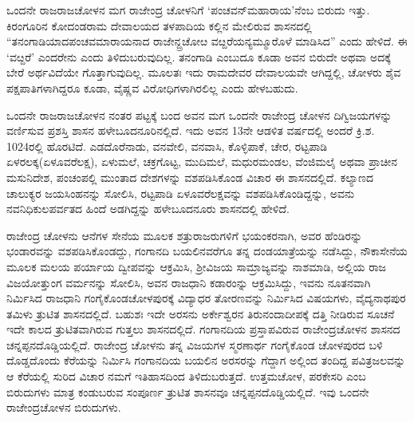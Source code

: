 ಒಂದನೇ ರಾಜರಾಜಚೋಳನ ಮಗ ರಾಜೇಂದ್ರ ಚೋಳನಿಗೆ ‘ಪಂಚವನ್​ಮಹಾರಾಯ’ನೆಂಬ ಬಿರುದು ಇತ್ತು. ಕಿರಂಗೂರಿನ ಕೋದಂಡರಾಮ ದೇವಾಲಯದ ತಳಪಾದಿಯ ಕಲ್ಲಿನ ಮೇಲಿರುವ ಶಾಸನದಲ್ಲಿ “ತನಂಗಾಡಿಯಾದ\break ಪಂಚವಮಾರಾಯನಾದ ರಾಜೇನ್ದ್ರಚೋೞ ವೞ್ದರೆಯನ್ಯಮ್ಮೂರೊಳೆ ಮಾಡಿಸಿದ” ಎಂದು ಹೇಳಿದೆ. ಈ ‘ವೞ್ದರೆ’ ಎಂದರೇನು ಎಂದು ತಿಳಿದುಬರುವುದಿಲ್ಲ. ತನಂಗಾಡಿ ಎಂಬುದೂ ಕೂಡಾ ಅವನ ಬಿರುದೇ ಅಥವಾ ಅದಕ್ಕೆ ಬೇರೆ ಅರ್ಥವಿದೆಯೇ ಗೊತ್ತಾಗುವುದಿಲ್ಲ. ಮೂಲತಃ ಇದು ರಾಮದೇವರ ದೇವಾಲಯವೇ ಆಗಿದ್ದಲ್ಲಿ, ಚೋಳರು ಶೈವ ಪಕ್ಷಪಾತಿಗಳಾಗಿದ್ದರೂ ಕೂಡಾ, ವೈಷ್ಣವ ವಿರೋಧಿಗಳಾಗಿರಲಿಲ್ಲ ಎಂದು ಹೇಳಬಹುದು.

ಒಂದನೇ ರಾಜರಾಜಚೋಳನ ನಂತರ ಪಟ್ಟಕ್ಕೆ ಬಂದ ಅವನ ಮಗ ಒಂದನೇ ರಾಜೇಂದ್ರ ಚೋಳನ ದಿಗ್ವಿಜಯಗಳನ್ನು ವರ್ಣಿಸುವ ಪ್ರಶಸ್ತಿ ಶಾಸನ ಹಳೇಬೂದನೂರಿನಲ್ಲಿದೆ. ಇದು ಅವನ 13ನೇ ಆಡಳಿತ ವರ್ಷದಲ್ಲಿ ಅಂದರೆ ಕ್ರಿ.ಶ. 1024ರಲ್ಲಿ ಹೊರಟಿದೆ. ಎಡದೊರೆನಾಡು, ವನವೇಲಿ, ವನವಾಸಿ, ಕೊಳ್ಳಿಪಾಕೆ, ಚೇರ, ರಟ್ಟಪಾಡಿ ಏಳರಲಕ್ಕ(ಏಳೂವರೆಲಕ್ಷ), ಏಳುಮಲೆ, ಚಕ್ರಗೊಟ್ಟ, ಮುದಿಮಲೆ, ಮಧುರಮಂಡಲ, ವೆಂಜಿಮಲೈ ಅಥವಾ ಪ್ರಾಚೀನ ಮಸುನಿದೇಶ, ಪಂಚಂಪಲ್ಲಿ ಮುಂತಾದ ದೇಶಗಳನ್ನು ವಶಪಡಿಸಿಕೊಂಡ ವಿಚಾರ ಈ ಶಾಸನದಲ್ಲಿದೆ. ಕಲ್ಯಾಣದ ಚಾಲುಕ್ಯರ ಜಯಸಿಂಹನನ್ನು ಸೋಲಿಸಿ, ರಟ್ಟಪಾಡಿ ಏಳೂವರೆಲಕ್ಷವನ್ನು ವಶಪಡಿಸಿಕೊಂಡಿದ್ದನ್ನು, ಅವನು ನವನಿಧಿಕುಲಪರ್ವತದ ಹಿಂದೆ ಅಡಗಿದ್ದನ್ನು ಹಳೇಬೂದನೂರು ಶಾಸನದಲ್ಲಿ ಹೇಳಿದೆ.

ರಾಜೇಂದ್ರ ಚೋಳನು ಆನೆಗಳ ಸೇನೆಯ ಮೂಲಕ ಶತ್ರುರಾಜರುಗಳಿಗೆ ಭಯಂಕರನಾಗಿ, ಅವರ ಹೆಂಡಿರನ್ನು ಭಂಡಾರವನ್ನು ವಶಪಡಿಸಿಕೊಂಡದ್ದು, ಗಂಗಾನದಿ ಬಯಲಿನವರೆಗೂ ತನ್ನ ದಂಡಯಾತ್ರೆಯನ್ನು ನಡೆಸಿದ್ದು, ನೌಕಾಸೇನೆಯ ಮೂಲಕ ಮಲಯ ಪರ್ಯಾಯ ದ್ವೀಪವನ್ನು ಆಕ್ರಮಿಸಿ, ಶ‍್ರೀವಿಜಯ ಸಾಮ್ರಾಜ್ಯವನ್ನು ನಾಶಮಾಡಿ, ಅಲ್ಲಿಯ ರಾಜ ವಿಜಯೋತ್ತುಂಗ ವರ್ಮನನ್ನು ಸೋಲಿಸಿ, ಅವನ ರಾಜಧಾನಿ ಕಡಾರಂನ್ನು ಆಕ್ರಮಿಸಿದ್ದು, ಇವನು ನೂತನವಾಗಿ ನಿರ್ಮಿಸಿದ ರಾಜಧಾನಿ ಗಂಗೈಕೊಂಡಚೋಳಪುರಕ್ಕೆ ವಿದ್ಯಾಧರ ತೋರಣವನ್ನು ನಿರ್ಮಿಸಿದ ವಿಷಯಗಳು, ವೈದ್ಯನಾಥಪುರ ತಮಿಳು ತ್ರುಟಿತ ಶಾಸನ\-ದಲ್ಲಿದೆ. ಬಹುಶಃ ಇದೇ ಅರಸನು ಅರ್ಕೇಶ್ವರನ ತಿರುನಂದಾದೀಪಕ್ಕೆ ದತ್ತಿ ನೀಡಿರುವ ಸೂಚನೆ ಇದೇ ಕಾಲದ ತ್ರುಟಿತವಾಗಿರುವ ಗುತ್ತಲು ಶಾಸನದಲ್ಲಿದೆ. ಗಂಗಾನದಿಯ ಪ್ರಸ್ತಾಪವಿರುವ ರಾಜೇಂದ್ರಚೋಳನ ಶಾಸನದ ಚನ್ನಪ್ಪನದೊಡ್ಡಿಯಲ್ಲಿದೆ. ರಾಜೇಂದ್ರ ಚೋಳನು ತನ್ನ ವಿಜಯಗಳ ಸ್ಮರಣಾರ್ಥ ಗಂಗೈಕೊಂಡ ಚೋಳಪುರದ ಬಳಿ ದೊಡ್ಡದೊಂದು ಕೆರೆಯನ್ನು ನಿರ್ಮಿಸಿ ಗಂಗಾನದಿಯ ಬಯಲಿನ ಅರಸರನ್ನು ಗೆದ್ದಾಗ ಅಲ್ಲಿಂದ ತಂದಿದ್ದ ಪವಿತ್ರಜಲವನ್ನು ಆ ಕೆರೆಯಲ್ಲಿ ಸುರಿದ ವಿಚಾರ ನಮಗೆ ಇತಿಹಾಸದಿಂದ ತಿಳಿದುಬರುತ್ತದೆ. ಉತ್ತಮಚೋಳ, ಪರಕೇಸರಿ ಎಂಬ ಬಿರುದುಗಳು ಮಾತ್ರ ಕಂಡುಬರುವ ಸಂಪೂರ್ಣ ತ್ರುಟಿತ ಶಾಸನವೂ ಚನ್ನಪ್ಪನದೊಡ್ಡಿಯಲ್ಲಿದೆ. ಇವು ಒಂದನೇ ರಾಜೇಂದ್ರಚೋಳನ ಬಿರುದುಗಳು.

